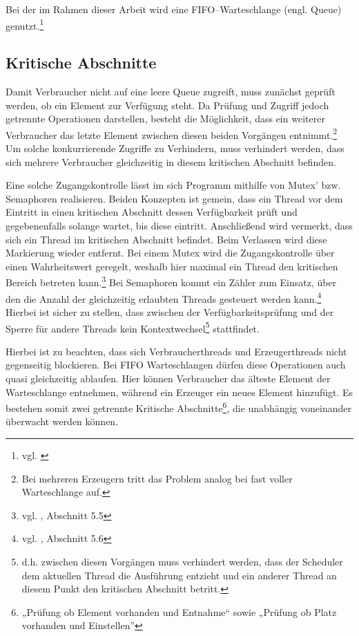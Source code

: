 Bei der im Rahmen dieser Arbeit wird eine FIFO–Warteschlange (engl. Queue) genutzt.\footnote{vgl. \cite{javadoc:lbq}}


\subsection{Kritische Abschnitte} %
\label{sub:kritische_abschnitte}

Damit Verbraucher nicht auf eine leere Queue zugreift, muss zunächst geprüft werden, ob ein Element zur Verfügung steht. Da Prüfung und Zugriff jedoch getrennte Operationen darstellen, besteht die Möglichkeit, dass ein weiterer Verbraucher das letzte Element zwischen diesen beiden Vorgängen entnimmt.\footnote{Bei mehreren Erzeugern tritt das Problem analog bei fast voller Warteschlange auf.} Um solche konkurrierende Zugriffe zu Verhindern, muss verhindert werden, dass sich mehrere Verbraucher gleichzeitig in diesem kritischen Abschnitt befinden.

Eine solche Zugangskontrolle lässt im sich Programm mithilfe von Mutex' bzw. Semaphoren realisieren. Beiden Konzepten ist gemein, dass ein Thread vor dem Eintritt in einen kritischen Abschnitt dessen Verfügbarkeit prüft und gegebenenfalls solange wartet, bis diese eintritt. Anschließend wird vermerkt, dass sich ein Thread im kritischen Abschnitt befindet. Beim Verlassen wird diese Markierung wieder entfernt. Bei einem Mutex wird die Zugangskontrolle über einen Wahrheitswert geregelt, weshalb hier maximal ein Thread den kritischen Bereich betreten kann.\footnote{vgl. \cite{oscon}, Abschnitt 5.5} Bei Semaphoren kommt ein Zähler zum Einsatz, über den die Anzahl der gleichzeitig erlaubten Threads gesteuert werden kann.\footnote{vgl. \cite{oscon}, Abschnitt 5.6} Hierbei ist sicher zu stellen, dass zwischen der Verfügbarkeitsprüfung und der Sperre für andere Threads kein Kontextwechsel\footnote{d.h. zwischen diesen Vorgängen muss verhindert werden, dass der Scheduler dem aktuellen Thread die Ausführung entzieht und ein anderer Thread an diesem Punkt den kritischen Abschnitt betritt.} stattfindet.

Hierbei ist zu beachten, dass sich Verbraucherthreads und Erzeugerthreads nicht gegenseitig blockieren. Bei \ac{FIFO} Warteschlangen dürfen diese Operationen auch quasi gleichzeitig ablaufen. Hier können Verbraucher das älteste Element der Warteschlange entnehmen, während ein Erzeuger ein neues Element hinzufügt. Es bestehen somit zwei getrennte Kritische Abschnitte\footnote{„Prüfung ob Element vorhanden und Entnahme“ sowie „Prüfung ob Platz vorhanden und Einstellen”}, die unabhängig voneinander überwacht werden können.


